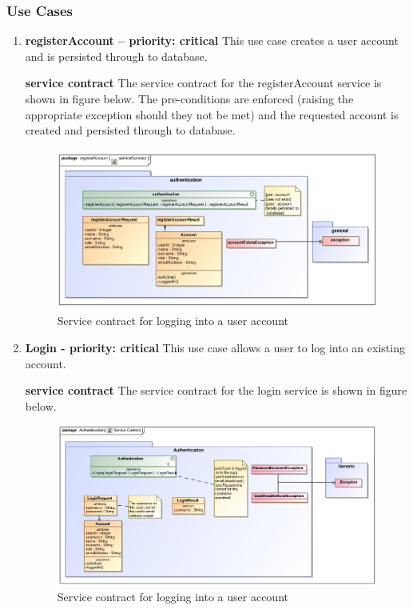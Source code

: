 \documentclass[12pt]{article}
\begin{document}
\newpage
\subsubsection{Use Cases}

\begin{enumerate}


\item \textbf{registerAccount  – priority: critical } 
This use case creates  a user account and is persisted through to database.

\par{\textbf{service contract} The service contract for the registerAccount  service is shown in figure below. The pre-conditions are enforced (raising the appropriate exception should they not be met) and the requested account is created and persisted through to database.}
\begin{figure}[h]
		\includegraphics[height=200px, width=500px]{epsImages/Authentication/serviceContract.eps}
		\caption{Service contract for logging into a user account}
\end{figure}
\item \textbf{Login - priority: critical}
This use case allows a user to log into an existing account.

\par{\textbf{service contract} The service contract for the login service is shown in figure below.}
\begin{figure}[h]
		\includegraphics[height=200px, width=500px]{epsImages/Authentication/LoginServiceContract.eps}
		\caption{Service contract for logging into a user account}
\end{figure}


\end{enumerate}
\end{document}
